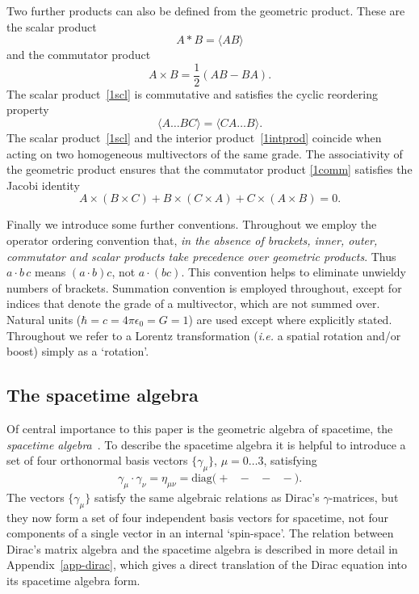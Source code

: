 \documentclass[a4paper]{article}
\numberwithin{equation}{section}
\newcommand{\dt}{\! \cdot \!}
\newcommand{\crs}{\! \times \!}
\newcommand{\scp}{\! \ast \!}
\newcommand{\la}{\langle}
\newcommand{\ra}{\rangle}
\newcommand{\half}{{\textstyle \frac{1}{2}}}
\newcommand{\eqv}{=}
\newcommand{\gamdm}{\gamma_\mu}
\newcommand{\gamdn}{\gamma_\nu}
\begin{document}
Two further products can also be defined from the geometric
product.  These are the scalar product 
%
\begin{equation}
A \scp B \eqv \la AB \ra
\label{1scl}
\end{equation}
%
and the commutator product
%
\begin{equation}
A \crs B \eqv \half (AB - BA).
\label{1comm}
\end{equation}
%
The scalar product~\eqref{1scl} is commutative and satisfies the
cyclic reordering property 
%
\begin{equation}
\la A \ldots B C \ra = \la C A \ldots B\ra.
\end{equation}
%
The scalar product~\eqref{1scl} and the interior product~\eqref{1intprod}
coincide when acting on two homogeneous multivectors of the same
grade.  The associativity of the geometric product ensures that the
commutator product \eqref{1comm} satisfies the Jacobi identity
%
\begin{equation}
A \crs (B \crs C) + B \crs (C \crs A) + C \crs (A \crs B) =0.
\end{equation}


Finally we introduce some further conventions.  Throughout we employ
the operator ordering convention that, {\em in the absence of brackets,
inner, outer, commutator and scalar products take precedence over
geometric products}.  Thus $a \dt b\, c$ means $(a \dt b)c$, not $a
\dt( b c)$.  This convention helps to eliminate unwieldy numbers of
brackets.  Summation convention is employed throughout, except for
indices that denote the grade of a multivector, which are not summed
over.  Natural units ($\hbar=c=4\pi\epsilon_0=G=1$) are used except where
explicitly stated.  Throughout we refer to a Lorentz transformation
(\textit{i.e.} a spatial rotation and/or boost) simply as a `rotation'.  



\subsection{The spacetime algebra}
\label{O-STA} 

Of central importance to this paper is the geometric algebra of
spacetime, the {\em spacetime algebra}~\cite{hes-sta}.  To describe
the spacetime algebra it is helpful to introduce a set of four
orthonormal basis vectors $\{\gamdm\}$, $\mu = 0 \ldots 3$, satisfying
%
\begin{equation}
\gamdm \dt \gamdn = \eta_{\mu \nu} 
= \mbox{diag($+$\ $-$\ $-$\ $-$)}.
\end{equation}
%
The vectors $\{\gamdm\}$ satisfy the same algebraic relations as
Dirac's $\gamma$-matrices, but they now form a set of four independent
basis vectors for spacetime, not four components of a single vector in
an internal `spin-space'.  The relation between Dirac's matrix algebra
and the spacetime algebra is described in more detail in
Appendix~\ref{app-dirac}, which gives a direct translation of the
Dirac equation into its spacetime algebra form.
\end{document}
